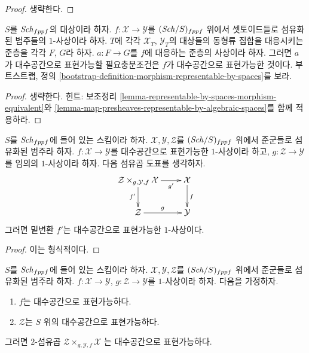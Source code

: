 \begin{proof}
생략한다.
\end{proof}

\begin{lemma}
\label{lemma-map-fibred-setoids-representable-algebraic-spaces}
$S$를 $\mathit{Sch}_{fppf}$의 대상이라 하자. $f : \mathcal{X} \to \mathcal{Y}$를
$(\mathit{Sch}/S)_{fppf}$ 위에서 셋토이드들로 섬유화된 범주들의 $1$-사상이라
하자. $T$에 각각 $\mathcal{X}_T$, $\mathcal{Y}_T$의 대상들의 동형류
집합을 대응시키는 준층을 각각 $F$, $G$라 하자. $a : F \to G$를 $f$에
대응하는 준층의 사상이라 하자. 그러면 $a$가 대수공간으로 표현가능할
필요충분조건은 $f$가 대수공간으로 표현가능한 것이다. 부트스트랩, 정의
\ref{bootstrap-definition-morphism-representable-by-spaces}를 보라.
\end{lemma}

\begin{proof}
생략한다. 힌트: 보조정리
\ref{lemma-representable-by-spaces-morphism-equivalent}와
\ref{lemma-map-presheaves-representable-by-algebraic-spaces}를 함께
적용하라.
\end{proof}

\begin{lemma}
\label{lemma-base-change-representable-by-spaces}
$S$를 $\mathit{Sch}_{fppf}$에 들어 있는 스킴이라 하자.
$\mathcal{X}, \mathcal{Y}, \mathcal{Z}$를 $(\mathit{Sch}/S)_{fppf}$ 위에서
준군들로 섬유화된 범주라 하자. $f : \mathcal{X} \to \mathcal{Y}$를
대수공간으로 표현가능한 $1$-사상이라 하고,
$g : \mathcal{Z} \to \mathcal{Y}$를 임의의 $1$-사상이라 하자.
다음 섬유곱 도표를 생각하자.
$$
\xymatrix{
\mathcal{Z} \times_{g, \mathcal{Y}, f} \mathcal{X} \ar[r]_-{g'} \ar[d]_{f'} &
\mathcal{X} \ar[d]^f \\
\mathcal{Z} \ar[r]^g & \mathcal{Y}
}
$$
그러면 밑변환 $f'$는 대수공간으로 표현가능한 $1$-사상이다.
\end{lemma}

\begin{proof}
이는 형식적이다.
\end{proof}

\begin{lemma}
\label{lemma-base-change-by-space-representable-by-space}
$S$를 $\mathit{Sch}_{fppf}$에 들어 있는 스킴이라 하자.
$\mathcal{X}, \mathcal{Y}, \mathcal{Z}$를 $(\mathit{Sch}/S)_{fppf}$ 위에서
준군들로 섬유화된 범주라 하자. $f : \mathcal{X} \to \mathcal{Y}$,
$g : \mathcal{Z} \to \mathcal{Y}$를 $1$-사상이라 하자. 다음을 가정하자.
\begin{enumerate}
\item $f$는 대수공간으로 표현가능하다.
\item $\mathcal{Z}$는 $S$ 위의 대수공간으로 표현가능하다.
\end{enumerate}
그러면 $2$-섬유곱
$\mathcal{Z} \times_{g, \mathcal{Y}, f} \mathcal{X}$
는 대수공간으로 표현가능하다.
\end{lemma}

